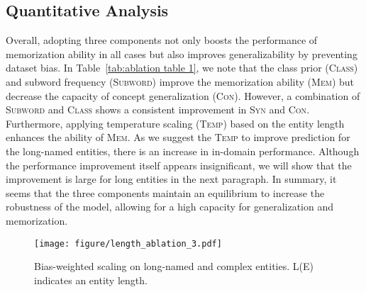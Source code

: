 \documentclass[11pt]{article}
\begin{document}
\subsection{Quantitative Analysis}
Overall, adopting three components not only boosts the performance of memorization ability in all cases but also improves  generalizability by preventing dataset bias.
In Table~\ref{tab:ablation table 1}, we note that the class prior (\textsc{Class}) and subword frequency (\textsc{Subword}) improve the memorization ability (\textsc{Mem}) but decrease the capacity of concept generalization (\textsc{Con}).
However, a combination of \textsc{Subword} and \textsc{Class} shows a consistent improvement in \textsc{Syn} and \textsc{Con}.
Furthermore, applying temperature scaling (\textsc{Temp}) based on the entity length enhances the ability of \textsc{Mem}. 
As we suggest the \textsc{Temp} to improve prediction for the long-named entities, there is an increase in in-domain performance.
Although the performance improvement itself appears insignificant, we will show that the improvement is large for long entities in the next paragraph.
In summary, it seems that the three components maintain an equilibrium to increase the robustness of the model, allowing for a high capacity for generalization and memorization.



\begin{figure}[!t]
 \centering
 \texttt{[image: figure/length\_ablation\_3.pdf]}
 \caption{Bias-weighted scaling on long-named and complex entities. L(E) indicates an entity length.}
 \label{fig:length ablation}
\end{figure}
\end{document}
